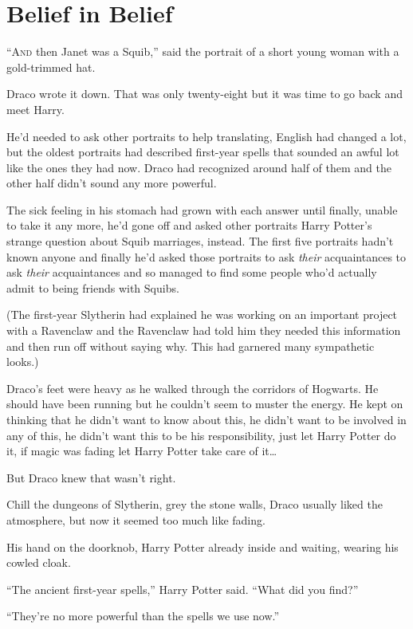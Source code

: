 \chapter{Belief in Belief}

\lettrine{“A}{nd} then Janet was a Squib,” said the portrait of a short young woman with a
gold-trimmed hat.

Draco wrote it down. That was only twenty-eight but it was time to go back and
meet Harry.

He’d needed to ask other portraits to help translating, English had changed a
lot, but the oldest portraits had described first-year spells that sounded an
awful lot like the ones they had now. Draco had recognized around half of them
and the other half didn’t sound any more powerful.

The sick feeling in his stomach had grown with each answer until finally,
unable to take it any more, he’d gone off and asked other portraits Harry
Potter’s strange question about Squib marriages, instead. The first five
portraits hadn’t known anyone and finally he’d asked those portraits to ask
\emph{their} acquaintances to ask \emph{their} acquaintances and so managed to
find some people who’d actually admit to being friends with Squibs.

(The first-year Slytherin had explained he was working on an important project
with a Ravenclaw and the Ravenclaw had told him they needed this information
and then run off without saying why. This had garnered many sympathetic looks.)

Draco’s feet were heavy as he walked through the corridors of Hogwarts. He
should have been running but he couldn’t seem to muster the energy. He kept on
thinking that he didn’t want to know about this, he didn’t want to be involved
in any of this, he didn’t want this to be his responsibility, just let Harry
Potter do it, if magic was fading let Harry Potter take care of it…

But Draco knew that wasn’t right.

Chill the dungeons of Slytherin, grey the stone walls, Draco usually liked the
atmosphere, but now it seemed too much like fading.

His hand on the doorknob, Harry Potter already inside and waiting, wearing his
cowled cloak.

“The ancient first-year spells,” Harry Potter said. “What did you find?”

“They’re no more powerful than the spells we use now.”

